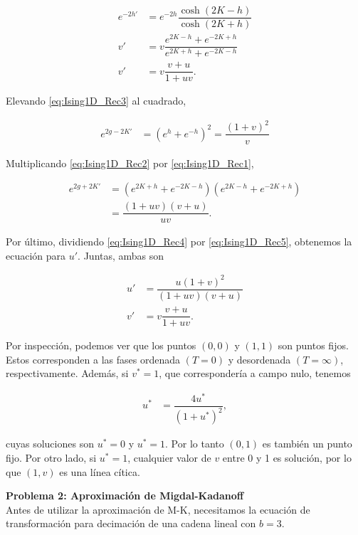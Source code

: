 \documentclass[10pt]{article}
\begin{document}
\begin{align}
e^{-2h'} &= e^{-2h} \dfrac{\cosh(2K-h)}{\cosh(2K+h)} \nonumber \\
v' &= v \dfrac{e^{2K-h} + e^{-2K+h}}{e^{2K+h} + e^{-2K-h}} \nonumber \\
v' &= v \dfrac{v+u}{1+uv}.
\end{align}

Elevando \ref{eq:Ising1D_Rec3} al cuadrado,

\begin{align}\label{eq:Ising1D_Rec4}
e^{2g-2K'} &= (e^h + e^{-h})^2 = \dfrac{(1+v)^2}{v} 
\end{align}

Multiplicando \ref{eq:Ising1D_Rec2} por  \ref{eq:Ising1D_Rec1},

\begin{align}
e^{2g+2K'} &= (e^{2K+h} + e^{-2K-h}) (e^{2K-h} + e^{-2K+h}) \nonumber \\
&= \dfrac{(1+uv)(v+u)}{uv}. \label{eq:Ising1D_Rec5}
\end{align}

Por \'ultimo, dividiendo \ref{eq:Ising1D_Rec4} por \ref{eq:Ising1D_Rec5}, obtenemos la ecuaci\'on para $u'$. Juntas, ambas son

\begin{align}
u' &= \dfrac{u (1+v)^2}{(1+uv)(v+u)} \\
v' &= v \dfrac{v+u}{1+uv}.
\end{align}

Por inspecci\'on, podemos ver que los puntos $(0,0)$ y $(1,1)$ son puntos fijos. Estos corresponden a las fases ordenada $(T = 0)$ y desordenada $(T = \infty)$, respectivamente. Adem\'as, si $v^*=1$, que corresponder\'ia a campo nulo, tenemos

\begin{align}
u^* &= \dfrac{4u^*}{(1+u^*)^2},
\end{align}

cuyas soluciones son $u^* = 0$ y $u^* = 1$. Por lo tanto $(0,1)$ es tambi\'en un punto fijo. Por otro lado, si $u^* = 1$, cualquier valor de $v$ entre 0 y 1 es soluci\'on, por lo que $(1,v)$ es una l\'inea c\'itica.

\pagebreak

\textbf{Problema 2: Aproximaci\'on de Migdal-Kadanoff}\\

Antes de utilizar la aproximaci\'on de M-K, necesitamos la ecuaci\'on de transformaci\'on para decimaci\'on de una cadena lineal con $b = 3$.
\end{document}
